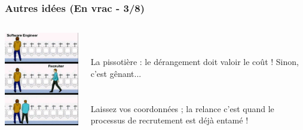 \documentclass[slidetop,11pt]{beamer}
\begin{document}
\begin{frame}
	\frametitle{Autres id{\'e}es (En vrac - 3/8)}
	\begin{columns}[T]
	\begin{column}[T]{5cm}
		\includegraphics[width=5cm]{img/1655474560502.jpeg}~\\
	\end{column}
	\begin{column}[T]{7cm}
		~\\ \hfill ~\\
		La pissoti{\`e}re : le d{\'e}rangement doit valoir le co{\^u}t ! Sinon, c'est g{\^e}nant...~\\~\\~\\
		
		Laissez vos coordonn{\'e}es ; la relance c'est quand le processus de recrutement est d{\'e}j{\`a} entam{\'e} !
	\end{column}
	\end{columns}
\end{frame}
\end{document}
